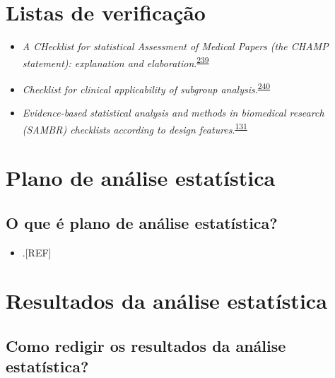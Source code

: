 \documentclass[
  a4paper,
]{book}
\providecommand{\tightlist}{%
  \setlength{\itemsep}{0pt}\setlength{\parskip}{0pt}}
\begin{document}
\hypertarget{checklists}{%
\section{Listas de verificação}\label{checklists}}

\begin{itemize}
\item
  \emph{A CHecklist for statistical Assessment of Medical Papers (the CHAMP statement): explanation and elaboration}.\textsuperscript{\protect\hyperlink{ref-Mansournia2021}{239}}
\item
  \emph{Checklist for clinical applicability of subgroup analysis}.\textsuperscript{\protect\hyperlink{ref-Gil-Sierra2020}{240}}
\item
  \emph{Evidence-based statistical analysis and methods in biomedical research (SAMBR) checklists according to design features}.\textsuperscript{\protect\hyperlink{ref-dwivedi2019}{131}}
\end{itemize}

\hypertarget{plano-analise-estatistica}{%
\section{Plano de análise estatística}\label{plano-analise-estatistica}}

\hypertarget{o-que-uxe9-plano-de-anuxe1lise-estatuxedstica}{%
\subsection{O que é plano de análise estatística?}\label{o-que-uxe9-plano-de-anuxe1lise-estatuxedstica}}

\begin{itemize}
\tightlist
\item
  .{[}REF{]}
\end{itemize}

\hypertarget{resultados-analise-estatistica}{%
\section{Resultados da análise estatística}\label{resultados-analise-estatistica}}

\hypertarget{como-redigir-os-resultados-da-anuxe1lise-estatuxedstica}{%
\subsection{Como redigir os resultados da análise estatística?}\label{como-redigir-os-resultados-da-anuxe1lise-estatuxedstica}}
\end{document}

